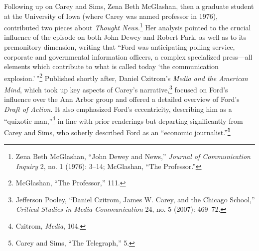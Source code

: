 \documentclass[twoside,symmetric,nobib,justified]{tufte-book}
\begin{document}
Following up on Carey and Sims, Zena Beth McGlashan, then a graduate
student at the University of Iowa (where Carey was named professor in
1976), contributed two pieces about \emph{Thought News}.\footnote{Zena
  Beth McGlashan, ``John Dewey and News,'' \emph{Journal of
  Communication Inquiry} 2, no. 1 (1976): 3­--14; McGlashan, ``The
  Professor.''} Her analysis pointed to the crucial influence of the
episode on both John Dewey and Robert Park, as well as to its
premonitory dimension, writing that ``Ford was anticipating polling
service, corporate and governmental information officers, a complex
specialized press---all elements which contribute to what is called
today `the communication explosion.'\,''\footnote{McGlashan, ``The
  Professor,'' 111.} Published shortly after, Daniel Czitrom's
\emph{Media and the American Mind}, which took up key aspects of Carey's
narrative,\footnote{Jefferson Pooley, ``Daniel Czitrom, James W. Carey,
  and the Chicago School,'' \emph{Critical Studies in Media
  Communication} 24, no. 5 (2007): 469--72.} focused on Ford's influence
over the Ann Arbor group and offered a detailed overview of Ford's
\emph{Draft of Action}. It also emphasized Ford's eccentricity,
describing him as a ``quixotic man,''\footnote{Czitrom, \emph{Media},
  104.} in line with prior renderings but departing significantly from
Carey and Sims, who soberly described Ford as an ``economic
journalist.''\footnote{Carey and Sims, ``The Telegraph,'' 5.}
\end{document}
